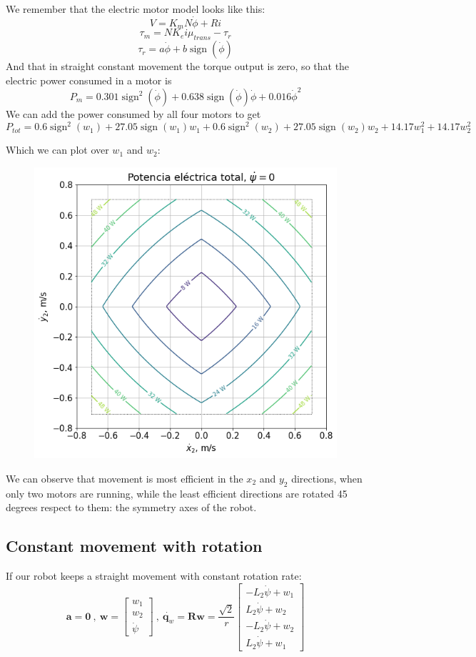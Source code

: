 \documentclass[12pt]{article}
\renewcommand{\vec}[1]{\bm{#1}}
\newcommand{\R}{\mathbb R}
\newcommand{\w}{\dot\varphi}
\def\R{\vec R}
\def\q{\vec q}
\begin{document}
We remember that the electric motor model looks like this:
$$ V = K_m N\dot{\phi} + Ri$$
$$ \tau_m = N K_ei\mu_{trans} - \tau_r$$
$$ \tau_r = a \dot{\phi} + b\operatorname{sign}(\dot{\phi}) $$
And that in straight constant movement the torque output is zero, so that the electric power consumed in a motor is 
$$ P_m = 0.301 \operatorname{sign}^{2}\left(\dot{\phi}\right) + 0.638 \operatorname{sign}\left(\dot{\phi}\right) \dot{\phi} + 0.016 \dot{\phi}^{2}$$
We can add the power consumed by all four motors to get 
$$P_{tot} = 0.6 \operatorname{sign}^{2}\left(w_1\right) + 27.05 \operatorname{sign}\left(w_1\right) w_1 + 0.6 \operatorname{sign}^{2}\left(w_2\right) + 27.05 \operatorname{sign}\left(w_2\right) w_2 + 14.17 w_1^{2} + 14.17 w_2^{2}$$

Which we can plot over $w_1$ and $w_2$: 
\begin{figure}[h]
	\centering
	\includegraphics[width=.5\linewidth]{power_map_base_2}
	\label{fig:power_ct_speed}
\end{figure}

We can observe that movement is most efficient in the $x_2$ and $y_2$ directions, when only two motors are running, while the least efficient directions are rotated 45 degrees respect to them: the symmetry axes of the robot.
\subsection{Constant movement with rotation}
If our robot keeps a straight movement with constant rotation rate:
$$ \vec{a} = \vec{0}\ ,\ \vec{w} = \left[\begin{matrix}w_1\\w_2\\\dot{\psi}\end{matrix}\right]\ ,\ \dot{\q_w} = \R \vec{w} = \frac{\sqrt{2}}{r} \left[\begin{matrix}- L_{2} \dot{\psi} + w_1\\L_{2} \dot{\psi} + w_2\\- L_{2} \dot{\psi} + w_2\\L_{2} \dot{\psi} + w_1\end{matrix}\right]$$
\end{document}
